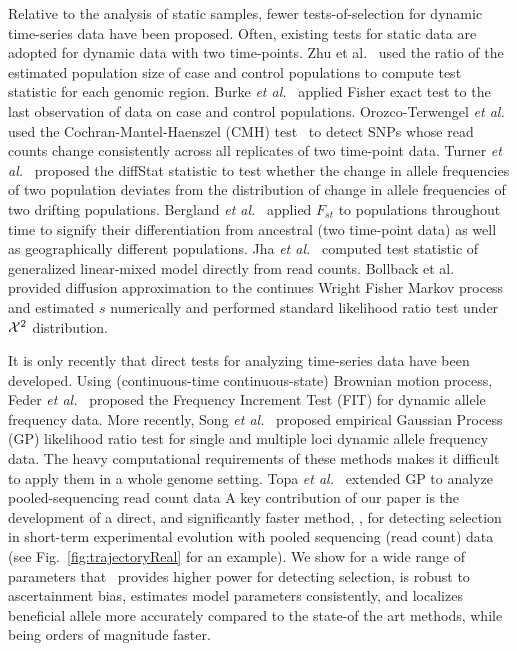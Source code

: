 \documentclass[11pt]{article}
\def\comale{\text{{\sc Comale}}}
\begin{document}
Relative to the analysis of static samples, fewer tests-of-selection
for dynamic time-series data have been proposed. Often, existing tests
for static data are adopted for dynamic data with two time-points. Zhu
et al.~\cite{zhou2011experimental} used the ratio of the estimated
population size of case and control populations to compute test
statistic for each genomic region. Burke \emph{et
  al.}~\cite{burke2010genome} applied Fisher exact test to the last
observation of data on case and control populations.  Orozco-Terwengel
\emph{et al.}~\cite{orozco2012adaptation} used the
Cochran-Mantel-Haenszel (CMH) test~\cite{agresti2011categorical} to
detect SNPs whose read counts change consistently across all
replicates of two time-point data.  Turner \emph{et
  al.}~\cite{turner2011population} proposed the diffStat statistic to
test whether the change in allele frequencies of two population
deviates from the distribution of change in allele frequencies of two
drifting populations.  Bergland \emph{et
  al.}~\cite{bergland2014genomic} applied $F_{st}$ to populations
throughout time to signify their differentiation from ancestral (two
time-point data) as well as geographically different populations. Jha
\emph{et al.}~\cite{jha2015whole} computed test statistic of
generalized linear-mixed model directly from read counts.  Bollback et
al.~\cite{bollback2008estimation} provided diffusion approximation to
the continues Wright Fisher Markov process and estimated $s$
numerically and performed standard likelihood ratio test under ${\cal X}^2$
distribution.

It is only recently that direct tests for analyzing time-series data
have been developed. Using (continuous-time continuous-state) Brownian
motion process, Feder \emph{et al.}~\cite{feder2014Identifying}
proposed the Frequency Increment Test (FIT) for dynamic allele
frequency data. More recently, Song \emph{et
  al.}~\cite{Terhorst2015Multi} proposed empirical Gaussian Process
(GP) likelihood ratio test for single and multiple loci dynamic allele
frequency data. The heavy computational requirements of these methods
makes it difficult to apply them in a whole genome setting.  
Topa \emph{et al.}~\cite{topa2015gaussian} extended GP to analyze 
pooled-sequencing
read count data
A key
contribution of our paper is the development of a direct, and
significantly faster method, \comale, for detecting selection in
short-term experimental evolution with pooled sequencing (read count)
data (see Fig.~\ref{fig:trajectoryReal} for an example).  We show for a wide 
range of parameters that \comale\ provides
higher power for detecting selection, is robust to ascertainment bias,
estimates model parameters consistently, and localizes beneficial
allele more accurately compared to the state-of the art methods, while
being orders of magnitude faster.
\end{document}
